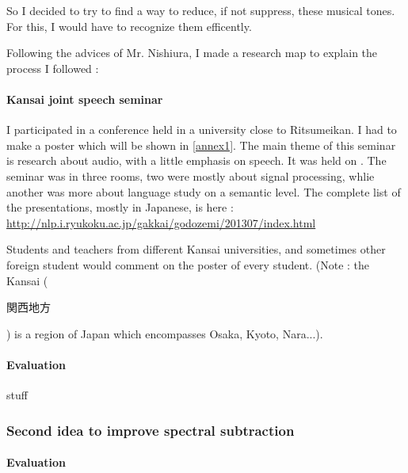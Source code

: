 So I decided to try to find a way to reduce, if not suppress, these musical tones.
For this, I would have to recognize them efficently.

Following the advices of Mr. Nishiura, I made a research map to explain the process I followed : 


\paragraph{Kansai joint speech seminar}
I participated in a conference held in a university close to Ritsumeikan. I had to make a poster which will be shown in \ref{annex1}.
The main theme of this seminar is research about audio, with a little emphasis on speech. It was held on . The seminar was in three rooms, two were mostly about signal processing, whlie another was more about language study on a semantic level. The complete list of the presentations, mostly in Japanese, is here : \url{http://nlp.i.ryukoku.ac.jp/gakkai/godozemi/201307/index.html}

Students and teachers from different Kansai universities, and sometimes other foreign student would comment on the poster of every student.
(Note : the Kansai (\begin{CJK}{UTF8}{min}関西地方\end{CJK}) is a region of Japan which encompasses Osaka, Kyoto, Nara...).
\paragraph{Evaluation}
stuff
\subsubsection{Second idea to improve spectral subtraction}
\paragraph{Evaluation}